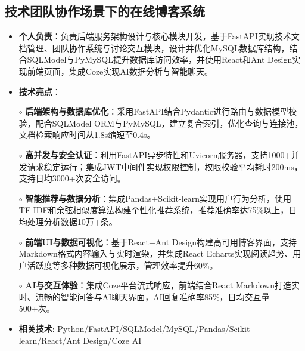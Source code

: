 \subsection{\textbf{技术团队协作场景下的在线博客系统} \hspace{2cm}{2025.06 -- 至今}}
  \begin{normalsize}
    \begin{itemize}
    \item \textbf{个人负责}：负责后端服务架构设计与核心模块开发，基于FastAPI实现技术文档管理、团队协作系统与讨论交互模块，设计并优化MySQL数据库结构，结合SQLModel与PyMySQL提升数据库访问效率，并使用React和Ant Design实现前端页面，集成Coze实现AI数据分析与智能聊天。
    \item \textbf{技术亮点}：
    \setlength{\itemindent}{1em} %
      \item[$\circ$] \textbf{后端架构与数据库优化}：采用FastAPI结合Pydantic进行路由与数据模型校验，配合SQLModel ORM与PyMySQL，建立复合索引，优化查询与连接池，文档检索响应时间从1.8s缩短至0.4s。
      \item[$\circ$] \textbf{高并发与安全认证}：利用FastAPI异步特性和Uvicorn服务器，支持1000+并发请求稳定运行；集成JWT中间件实现权限控制，权限校验平均耗时200ms，支持日均3000+次安全访问。
      \item[$\circ$] \textbf{智能推荐与数据分析}：集成Pandas+Scikit-learn实现用户行为分析，使用TF-IDF和余弦相似度算法构建个性化推荐系统，推荐准确率达75\%以上，日均处理分析数据10万+条。
      \item[$\circ$] \textbf{前端UI与数据可视化}：基于React+Ant Design构建高可用博客界面，支持Markdown格式内容输入与实时渲染，并集成React Echarts实现阅读趋势、用户活跃度等多种数据可视化展示，管理效率提升60\%。
      \item[$\circ$] \textbf{AI与交互体验}：集成Coze平台流式响应，前端结合React Markdown打造实时、流畅的智能问答与AI聊天界面，AI回复准确率85\%，日均交互量500+次。
    \setlength{\itemindent}{0em} %
    \item \textbf{相关技术}: Python/FastAPI/SQLModel/MySQL/Pandas/Scikit-learn/React/Ant Design/Coze AI
    \end{itemize}
  \end{normalsize}